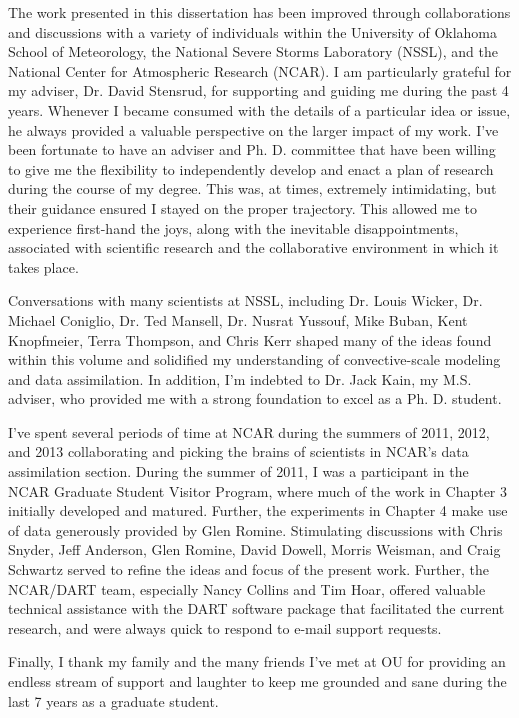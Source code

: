 \begin{preface}
The work presented in this dissertation has been improved through  collaborations and discussions with a variety of individuals within the University of Oklahoma School of Meteorology, the National Severe Storms Laboratory (NSSL), and the National Center for Atmospheric Research (NCAR). I am particularly grateful for my adviser, Dr. David Stensrud, for supporting and guiding me during the past 4 years. Whenever I became consumed with the details of a particular idea or issue, he always provided a valuable perspective on the larger impact of my work. I've been fortunate to have an adviser and Ph. D. committee that have been willing to give me the flexibility to independently develop and enact a plan of research during the course of my degree. This was, at times, extremely intimidating, but their guidance ensured I stayed on the proper trajectory. This allowed me to experience first-hand the joys, along with the inevitable disappointments, associated with scientific research and the collaborative environment in which it takes place.

Conversations with many scientists at NSSL, including Dr. Louis Wicker, Dr. Michael Coniglio, Dr. Ted Mansell, Dr. Nusrat Yussouf, Mike Buban, Kent Knopfmeier, Terra Thompson, and Chris Kerr shaped many of the ideas found within this volume and solidified my understanding of convective-scale modeling and data assimilation. In addition, I'm indebted to Dr. Jack Kain, my M.S. adviser, who provided me with a strong foundation to excel as a Ph. D. student.

I've spent several periods of time at NCAR during the summers of 2011, 2012, and 2013 collaborating and picking the brains of scientists in NCAR's data assimilation section. During the summer of 2011, I was a participant in the NCAR Graduate Student Visitor Program, where much of the work in Chapter 3 initially developed and matured. Further, the experiments in Chapter 4 make use of data generously provided by Glen Romine. Stimulating discussions with Chris Snyder, Jeff Anderson, Glen Romine, David Dowell, Morris Weisman, and Craig Schwartz served to refine the ideas and focus of the present work. Further, the NCAR/DART team, especially Nancy Collins and Tim Hoar, offered valuable technical assistance with the DART software package that facilitated the current research, and were always quick to respond to e-mail support requests.

Finally, I thank my family and the many friends I've met at OU for providing an endless stream of support and laughter to keep me grounded and sane during the last 7 years as a graduate student.


\end{preface}
